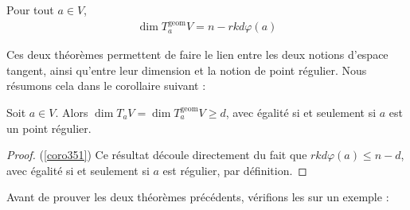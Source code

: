             \begin{theo}
                \label{theo354}
                Pour tout $a \in V$,
                \begin{align*}
                    \dim T_a^\mathrm{geom}V = n - rk d\varphi(a)
                \end{align*}
            \end{theo}
            Ces deux théorèmes permettent de faire le lien entre les deux notions d'espace tangent, ainsi qu'entre leur dimension et la notion de point régulier. Nous résumons cela dans le corollaire suivant :
            \begin{coro}
                \label{coro351}
                Soit $a \in V$. Alors $\dim T_aV = \dim T_a^\mathrm{geom}V \geq d$, avec égalité si et seulement si $a$ est un point régulier.
            \end{coro}
            \begin{proof} (\ref{coro351})
                Ce résultat découle directement du fait que $rk d\varphi(a) \leq n-d$, avec égalité si et seulement si $a$ est régulier, par définition.
            \end{proof}
            Avant de prouver les deux théorèmes précédents, vérifions les sur un exemple :
